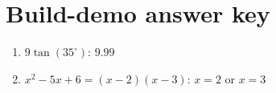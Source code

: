 \documentclass[12pt]{article}
\begin{document}
\section*{Build-demo answer key}

\begin{enumerate}
  \item $9\tan(35^\circ)$: \quad $\boxed{9.99}$
  \item $x^2 - 5x + 6 = (x-2)(x-3)$: \quad $\boxed{x = 2 \text{ or } x = 3}$
\end{enumerate}
\end{document}
